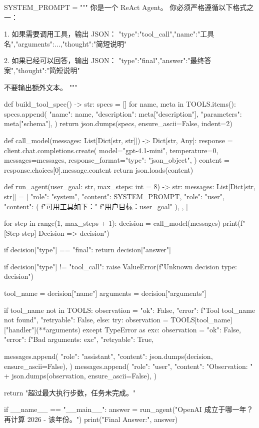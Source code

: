 \begin{codeblock}
SYSTEM_PROMPT = """
你是一个 ReAct Agent。
你必须严格遵循以下格式之一：

1. 如果需要调用工具，输出 JSON：
{"type":"tool_call","name":"工具名","arguments":{...},"thought":"简短说明"}

2. 如果已经可以回答，输出 JSON：
{"type":"final","answer":"最终答案","thought":"简短说明"}

不要输出额外文本。
"""


def build_tool_spec() -> str:
    specs = []
    for name, meta in TOOLS.items():
        specs.append({
            "name": name,
            "description": meta["description"],
            "parameters": meta["schema"],
        })
    return json.dumps(specs, ensure_ascii=False, indent=2)


def call_model(messages: List[Dict[str, str]]) -> Dict[str, Any]:
    response = client.chat.completions.create(
        model="gpt-4.1-mini",
        temperature=0,
        messages=messages,
        response_format={"type": "json_object"},
    )
    content = response.choices[0].message.content
    return json.loads(content)


def run_agent(user_goal: str, max_steps: int = 8) -> str:
    messages: List[Dict[str, str]] = [
        {"role": "system", "content": SYSTEM_PROMPT},
        {
            "role": "user",
            "content": (
                f"可用工具如下：\n\n"
                f"用户目标：{user_goal}"
            ),
        },
    ]

    for step in range(1, max_steps + 1):
        decision = call_model(messages)
        print(f"[Step {step}] Decision => {decision}")

        if decision["type"] == "final":
            return decision["answer"]

        if decision["type"] != "tool_call":
            raise ValueError(f"Unknown decision type: {decision}")

        tool_name = decision["name"]
        arguments = decision["arguments"]

        if tool_name not in TOOLS:
            observation = {
                "ok": False,
                "error": f"Tool {tool_name} not found",
                "retryable": False,
            }
        else:
            try:
                observation = TOOLS[tool_name]["handler"](**arguments)
            except TypeError as exc:
                observation = {
                    "ok": False,
                    "error": f"Bad arguments: {exc}",
                    "retryable": True,
                }

        messages.append(
            {
                "role": "assistant",
                "content": json.dumps(decision, ensure_ascii=False),
            }
        )
        messages.append(
            {
                "role": "user",
                "content": "Observation: " + json.dumps(observation, ensure_ascii=False),
            }
        )

    return "超过最大执行步数，任务未完成。"


if __name__ == "__main__":
    answer = run_agent("OpenAI 成立于哪一年？再计算 2026 - 该年份。")
    print("Final Answer:", answer)
\end{codeblock}
